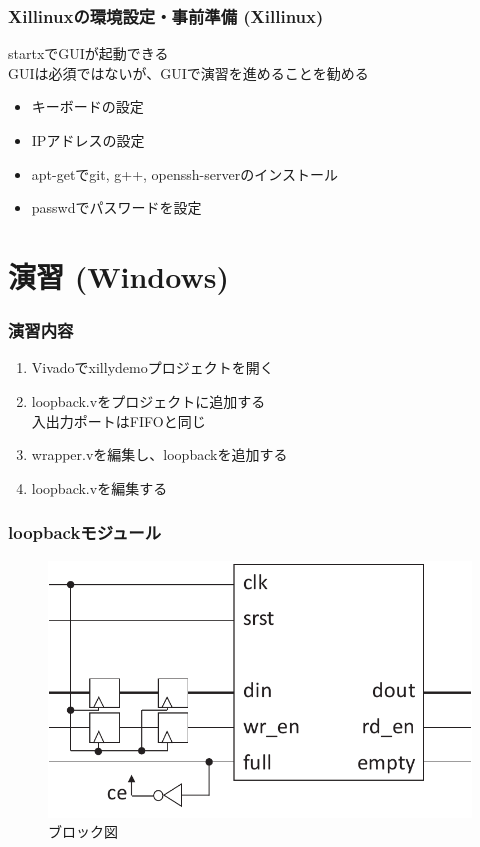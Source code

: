 ﻿\documentclass[dvipdfmx]{beamer}
\begin{document}
\begin{frame}
	\frametitle{Xillinuxの環境設定・事前準備 (Xillinux)}
	startxでGUIが起動できる\\
	GUIは必須ではないが、GUIで演習を進めることを勧める

	\begin{itemize}
		\item
			キーボードの設定
			\vfill
		\item
			IPアドレスの設定
			\vfill
		\item
			apt-getでgit, g++, openssh-serverのインストール
			\vfill
		\item
			passwdでパスワードを設定
	\end{itemize}
\end{frame}

\section{演習 (Windows)}
\begin{frame}
	\frametitle{演習内容}
	\begin{enumerate}
		\item
			Vivadoでxillydemoプロジェクトを開く
			\vfill
		\item
			loopback.vをプロジェクトに追加する\\
			入出力ポートはFIFOと同じ
			\vfill
		\item
			wrapper.vを編集し、loopbackを追加する
			\vfill
		\item
			loopback.vを編集する
	\end{enumerate}
\end{frame}

\begin{frame}
	\frametitle{loopbackモジュール}
	\begin{figure}[ht]
		\centering
		\includegraphics[width=0.8\linewidth]{../img/loopback.pdf}
		\caption{ブロック図}
		\label{img:loopback}
	\end{figure}
\end{frame}
\end{document}
